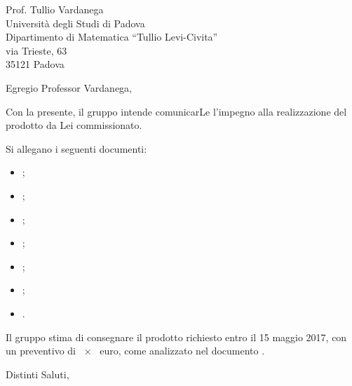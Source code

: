 \documentclass[a4paper]{letter} %
\begin{document}
\begin{letter}{
Prof. Tullio Vardanega\\
Università degli Studi di Padova\\
Dipartimento di Matematica “Tullio Levi-Civita”\\
via Trieste, 63\\
35121 Padova
}

\opening{Egregio Professor Vardanega,} %

Con la presente, il gruppo \hx{} intende comunicarLe l'impegno alla realizzazione del prodotto \proj{} da Lei commissionato.

Si allegano i seguenti documenti:%
\begin{itemize}
	\item \SdF;
	\item \NdP;
	\item \PdP;
	\item \PdQ;
	\item \AdR;
	\item \Glossario;
	\item \Verbali.
\end{itemize}

Il gruppo \hx{} stima di consegnare il prodotto richiesto entro il 15 maggio 2017, con un preventivo di \num{x} euro, come analizzato nel documento \PdP.

\closing{Distinti Saluti,\\
 \\
}

\end{letter}
\end{document}
